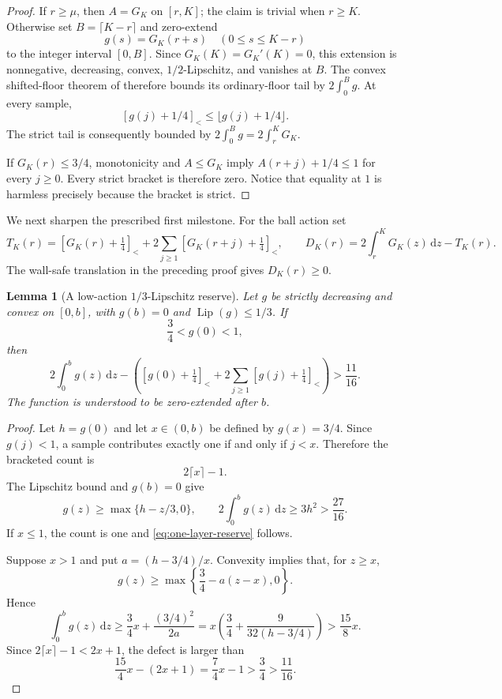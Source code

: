\documentclass[11pt]{article}
\newtheorem{lemma}[theorem]{Lemma}
\theoremstyle{remark}
\newcommand{\sbr}[1]{[#1]_{<}}
\newcommand{\dd}{\,\mathrm d}
\begin{document}
\begin{proof}
If $r\geq\mu$, then $A=G_K$ on $[r,K]$; the claim is trivial when
$r\geq K$.  Otherwise set $B=\lceil K-r\rceil$ and zero-extend
\[
 g(s)=G_K(r+s)\quad(0\leq s\leq K-r)
\]
to the integer interval $[0,B]$.  Since $G_K(K)=G_K'(K)=0$, this
extension is nonnegative, decreasing, convex, $1/2$-Lipschitz, and
vanishes at $B$.  The convex shifted-floor theorem of \cite{FLPSballs}
therefore bounds its ordinary-floor tail by $2\int_0^B g$.  At every
sample,
\[
 [g(j)+1/4]_<\leq\lfloor g(j)+1/4\rfloor.
\]
The strict tail is consequently bounded by
$2\int_0^Bg=2\int_r^KG_K$.

If $G_K(r)\leq3/4$, monotonicity and $A\leq G_K$ imply
$A(r+j)+1/4\leq1$ for every $j\geq0$.  Every strict bracket is therefore
zero.  Notice that equality at $1$ is harmless precisely because the
bracket is strict.
\end{proof}

We next sharpen the prescribed first milestone.  For the ball action set
\begin{equation}
 T_K(r)=\sbr{G_K(r)+\tfrac14}
 +2\sum_{j\geq1}\sbr{G_K(r+j)+\tfrac14},
 \qquad
 D_K(r)=2\int_r^KG_K(z)\dd z-T_K(r).
 \label{eq:ball-defect}
\end{equation}
The wall-safe translation in the preceding proof gives $D_K(r)\geq0$.

\begin{lemma}[A low-action $1/3$-Lipschitz reserve]
\label{lem:one-layer-reserve}
Let $g$ be strictly decreasing and convex on $[0,b]$, with $g(b)=0$ and
$\operatorname{Lip}(g)\leq1/3$.  If
\[
 \frac34<g(0)<1,
\]
then
\begin{equation}
 2\int_0^b g(z)\dd z-
 \left(\sbr{g(0)+\tfrac14}
 +2\sum_{j\geq1}\sbr{g(j)+\tfrac14}\right)>\frac{11}{16}.
 \label{eq:one-layer-reserve}
\end{equation}
The function is understood to be zero-extended after $b$.
\end{lemma}

\begin{proof}
Let $h=g(0)$ and let $x\in(0,b)$ be defined by $g(x)=3/4$.  Since
$g(j)<1$, a sample contributes exactly one if and only if $j<x$.
Therefore the bracketed count is
\[
 2\lceil x\rceil-1.
\]
The Lipschitz bound and $g(b)=0$ give
\[
 g(z)\geq\max\{h-z/3,0\},
 \qquad
 2\int_0^b g(z)\dd z\geq3h^2>\frac{27}{16}.
\]
If $x\leq1$, the count is one and \eqref{eq:one-layer-reserve} follows.

Suppose $x>1$ and put $a=(h-3/4)/x$.  Convexity implies that, for
$z\geq x$,
\[
 g(z)\geq\max\left\{\frac34-a(z-x),0\right\}.
\]
Hence
\[
 \int_0^b g(z)\dd z
 \geq\frac34x+\frac{(3/4)^2}{2a}
 =x\left(\frac34+\frac9{32(h-3/4)}\right)
 >\frac{15}{8}x.
\]
Since $2\lceil x\rceil-1<2x+1$, the defect is larger than
\[
 \frac{15}{4}x-(2x+1)=\frac74x-1>\frac34>\frac{11}{16}.
\]
\end{proof}
\end{document}

